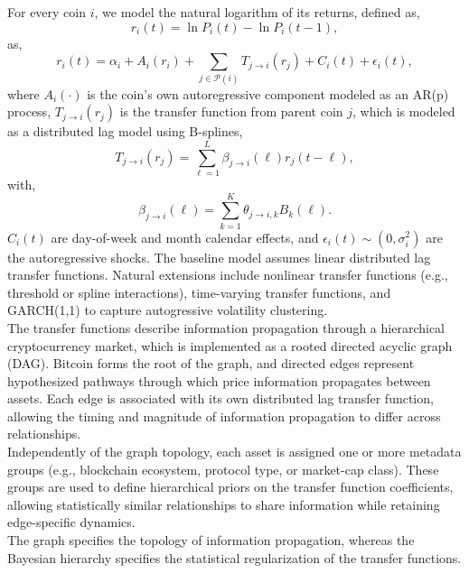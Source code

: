 \documentclass[11pt]{article}
\title{}
\author{Tijs~W.~Alleman, Ph.D.}
\date{\today}
\begin{document}
\maketitle

For every coin $i$, we model the natural logarithm of its returns, defined as,
\begin{equation}
r_i(t) = \ln P_i(t) - \ln P_i(t-1),
\end{equation}
as,
\begin{equation}
r_i(t) = \alpha_i + A_i(r_i) + \sum_{j \in \mathcal{P}(i)} T_{j \rightarrow i} (r_j) + C_i(t) + \epsilon_i(t),
\end{equation}
where $A_i(\cdot)$ is the coin's own autoregressive component modeled as an AR(p) process, $T_{j \rightarrow i} (r_j)$ is the transfer function from parent coin $j$, which is modeled as a distributed lag model using B-splines, 
\begin{equation}
T_{j \rightarrow i} (r_j) = \sum_{\ell = 1}^{L} \beta_{j \rightarrow i}(\ell) r_j(t-\ell),
\end{equation}
with,
\begin{equation}
\beta_{j \rightarrow i}(\ell) = \sum_{k=1}^K \theta_{j \rightarrow i, k} B_k(\ell).
\end{equation}
$C_i(t)$ are day-of-week and month calendar effects, and $\epsilon_i(t) \sim(0, \sigma_i^2)$ are the autoregressive shocks. The baseline model assumes linear distributed lag transfer functions. Natural extensions include nonlinear transfer functions (e.g., threshold or spline interactions), time-varying transfer functions, and GARCH(1,1) to capture autogressive volatility clustering.\\

The transfer functions describe information propagation through a hierarchical cryptocurrency market, which is implemented as a rooted directed acyclic graph (DAG). Bitcoin forms the root of the graph, and directed edges represent hypothesized pathways through which price information propagates between assets. Each edge is associated with its own distributed lag transfer function, allowing the timing and magnitude of information propagation to differ across relationships.\\

Independently of the graph topology, each asset is assigned one or more metadata groups (e.g., blockchain ecosystem, protocol type, or market-cap class). These groups are used to define hierarchical priors on the transfer function coefficients, allowing statistically similar relationships to share information while retaining edge-specific dynamics.\\

The graph specifies the topology of information propagation, whereas the Bayesian hierarchy specifies the statistical regularization of the transfer functions.
\end{document}
